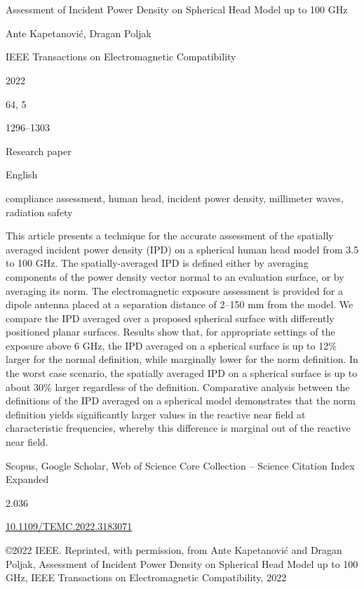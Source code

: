 \cleardoublepage

\chapter{}
\label{chap:a}

\begin{description}[leftmargin=!,labelwidth=\widthof{\bfseries Volume and number}]
    \item[Title] Assessment of Incident Power Density on Spherical Head Model up to 100 GHz
    \item[Authors] Ante Kapetanović, Dragan Poljak
    \item[Journal] IEEE Transactions on Electromagnetic Compatibility
    \item[Year] 2022
    \item[Volume and number] 64, 5
    \item[Pages] 1296--1303
    \item[Categorization] Research paper
    \item[Language] English
    \item[Keywords] compliance assessment, human head, incident power density, millimeter waves, radiation safety
    \item[Abstract] This article presents a technique for the accurate assessment of the spatially averaged incident power density (IPD) on a spherical human head model from 3.5 to 100 GHz.
    The spatially-averaged IPD is defined either by averaging components of the power density vector normal to an evaluation surface, or by averaging its norm.
    The electromagnetic exposure assessment is provided for a dipole antenna placed at a separation distance of 2--150 mm from the model.
    We compare the IPD averaged over a proposed spherical surface with differently positioned planar surfaces.
    Results show that, for appropriate settings of the exposure above 6 GHz, the IPD averaged on a spherical surface is up to 12\% larger for the normal definition, while marginally lower for the norm definition.
    In the worst case scenario, the spatially averaged IPD on a spherical surface is up to about 30\% larger regardless of the definition.
    Comparative analysis between the definitions of the IPD averaged on a spherical model demonstrates that the norm definition yields significantly larger values in the reactive near field at characteristic frequencies, whereby this difference is marginal out of the reactive near field.
    \item[Databases] Scopus, Google Scholar, Web of Science Core Collection -- Science Citation Index Expanded
    \item[Impact factor] 2.036
    \item[DOI] \href{https://doi.org/10.1109/TEMC.2022.3183071}{\url{10.1109/TEMC.2022.3183071}}
    \item[Copyright notice] \copyright 2022 IEEE. Reprinted, with permission, from Ante Kapetanović and Dragan Poljak, Assessment of Incident Power Density on Spherical Head Model up to 100 GHz, IEEE Transactions on Electromagnetic Compatibility, 2022
\end{description}

\cleardoublepage


